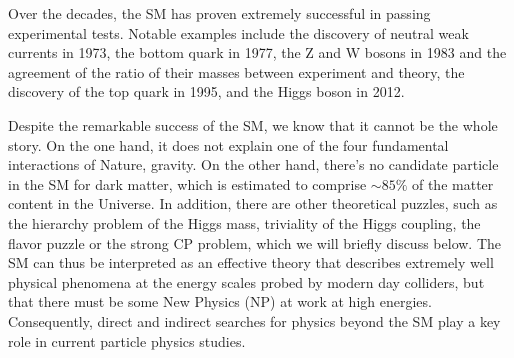 Over the decades, the SM has proven extremely successful in passing experimental tests. Notable examples include the discovery of neutral weak currents in 1973, the bottom quark in 1977, the Z and W bosons in 1983 and the agreement of the ratio of their masses between experiment and theory, the discovery of the top quark in 1995, and the Higgs boson in 2012. 

Despite the remarkable success of the SM, we know that it cannot be the whole story. On the one hand, it does not explain one of the four fundamental interactions of Nature, gravity. On the other hand, there's no candidate particle in the SM for dark matter, which is estimated to comprise $\sim85\%$ of the matter content in the Universe. In addition, there are other theoretical puzzles, such as the hierarchy problem of the Higgs mass, triviality of the Higgs coupling, the flavor puzzle or the strong CP problem, which we will briefly discuss below. The SM can thus be interpreted as an effective theory that describes extremely well physical phenomena at the energy scales probed by modern day colliders, but that there must be some New Physics (NP) at work at high energies. Consequently, direct and indirect searches for physics beyond the SM play a key role in current particle physics studies. 

